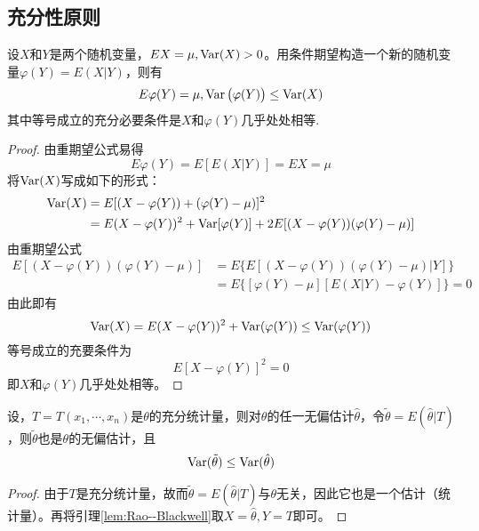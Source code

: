 \subsection{充分性原则}

\begin{lemma}\label{lem:Rao--Blackwell}
    设$X$和$Y$是两个随机变量，$EX=\mu,\operatorname{Var}(X)>0$。用条件期望构造一个新的随机变量$\varphi(Y)=E(X|Y)$，则有
    \[ E\varphi(Y) = \mu,\operatorname{Var}\big(\varphi(Y)\big) \le \operatorname{Var}(X) \]
    其中等号成立的充分必要条件是$X$和$\varphi(Y)$几乎处处相等.
\end{lemma}
\begin{proof}
    由重期望公式易得
    \[ E\varphi(Y)=E[E(X|Y)]=EX=\mu \]
    将$\operatorname{Var}(X)$写成如下的形式：
    \begin{align*}
        \operatorname{Var}(X) & = E[(X-\varphi(Y)) + (\varphi(Y) - \mu)]^2                                                       \\
                & = E(X-\varphi(Y))^2 + \operatorname{Var}[\varphi(Y)] + 2 E[(X-\varphi(Y))(\varphi(Y) - \mu)]
    \end{align*}
    由重期望公式
    \begin{align*}
        E[(X-\varphi(Y))(\varphi(Y) - \mu)] & =E\{ E[(X-\varphi(Y))(\varphi(Y) - \mu)|Y] \} \\
                                            & =E\{ [\varphi(Y)-\mu][E(X|Y)-\varphi(Y)] \}=0
    \end{align*}
    由此即有
    \[ \operatorname{Var}(X) = E(X-\varphi(Y))^2 + \operatorname{Var}(\varphi(Y)) \le \operatorname{Var}(\varphi(Y)) \]
    等号成立的充要条件为
    \[ E[X-\varphi(Y)]^2 = 0 \]
    即$X$和$\varphi(Y)$几乎处处相等。
\end{proof}

\begin{theorem}[充分性原则]
    设，$T=T(x_1,\cdots,x_n)$是$\theta$的充分统计量，则对$\theta$的任一无偏估计$\hat\theta$，令$\tilde\theta=E(\hat\theta|T)$，则$\tilde\theta$也是$\theta$的无偏估计，且
    \[ \operatorname{Var}(\tilde\theta) \le \operatorname{Var}(\hat\theta) \]
\end{theorem}
\begin{proof}
    由于$T$是充分统计量，故而$\tilde\theta=E(\hat\theta|T)$与$\theta$无关，因此它也是一个估计（统计量）。再将引理\ref{lem:Rao--Blackwell}取$X=\hat\theta,Y=T$即可。
\end{proof}


